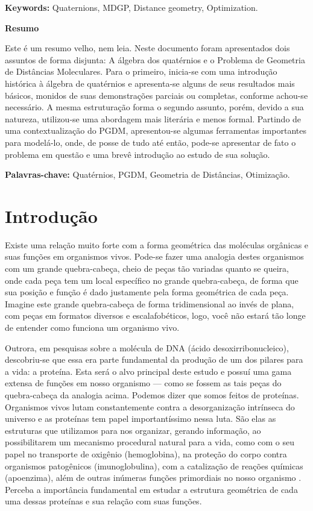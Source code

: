 \documentclass[a4paper,12pt]{article}
\begin{document}
	
	\textbf{Keywords:} Quaternions, MDGP, Distance geometry, Optimization.
	 
	
	\vspace{2cm}	
	\begin{center}
		\large
		\textbf{Resumo}
	\end{center}

	Este é um resumo velho, nem leia. Neste documento foram apresentados dois assuntos de forma disjunta: A álgebra dos quatérnios e o Problema de Geometria de Distâncias Moleculares. Para o primeiro, inicia-se com uma introdução histórica à álgebra de quatérnios e apresenta-se alguns de seus resultados mais básicos, monidos de suas demonstrações parciais ou completas, conforme achou-se necessário. A mesma estruturação forma o segundo assunto, porém, devido a sua natureza, utilizou-se uma abordagem mais literária e menos formal. Partindo de uma contextualização do PGDM, apresentou-se algumas ferramentas importantes para modelá-lo, onde, de posse de tudo até então, pode-se apresentar de fato o problema em questão e uma brevê introdução ao estudo de sua solução. 
	
	\textbf{Palavras-chave:} Quatérnios, PGDM, Geometria de Distâncias, Otimização.
	
	
	\newpage
	\section{Introdução}
	Existe uma relação muito forte com a forma geométrica das moléculas orgânicas e suas funções em organismos vivos. Pode-se fazer uma analogia destes organismos com um grande quebra-cabeça, cheio de peças tão variadas quanto se queira, onde cada peça tem um local específico no grande quebra-cabeça, de forma que sua posição e função é dado justamente pela forma geométrica de cada peça. Imagine este grande quebra-cabeça de forma tridimensional ao invés de plana, com peças em formatos diversos e escalafobéticos, logo, você não estará tão longe de entender como funciona um organismo vivo.
	
	Outrora, em pesquisas sobre a molécula de DNA (ácido desoxirribonucleico), descobriu-se que essa era parte fundamental da produção de um dos pilares para a vida: a proteína. Esta será o alvo principal deste estudo e possuí uma gama extensa de funções em nosso organismo --- como se fossem as tais peças do quebra-cabeça da analogia acima. Podemos dizer que somos feitos de proteínas. Organismos vivos lutam constantemente contra a desorganização intrínseca do universo e as proteínas tem papel importantíssimo nessa luta. São elas as estruturas que utilizamos para nos organizar, gerando informação, ao possibilitarem um mecanismo procedural natural para a vida, como com o seu papel no transporte de oxigênio (hemoglobina), na proteção do corpo contra organismos patogênicos (imunoglobulina), com a catalização de reações químicas (apoenzima), além de outras inúmeras funções primordiais no nosso organismo \cite{fidalgotese}. Perceba a importância fundamental em estudar a estrutura geométrica de cada uma dessas proteínas e sua relação com suas funções.
	
\end{document}
